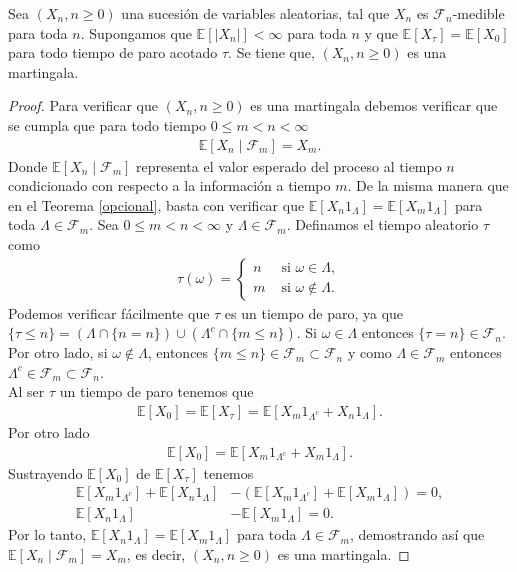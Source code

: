 \begin{theorem}
\label{condmartin}
	Sea $(X_n, n \geq 0)$ una sucesión de variables aleatorias, tal que $X_n$ es $\mathcal{F}_n$-medible para toda $n$. Supongamos que $\mathbb{E}[|X_n|] < \infty$ para toda $n$ y que $\mathbb{E}[X_{\tau}] = \mathbb{E}[X_0]$ para todo tiempo de paro acotado $\tau$. Se tiene que, $(X_n, n \geq 0)$ es una martingala.
\end{theorem}
\begin{proof}
	Para verificar que $(X_n, n \geq 0)$ es una martingala debemos verificar que se cumpla que para todo tiempo $0 \leq m < n < \infty$
	\begin{align*}
		\mathbb{E}[X_n \mid \mathcal{F}_m] = X_m.
	\end{align*}
	Donde $\mathbb{E}[X_n \mid \mathcal{F}_m]$ representa el valor esperado del proceso al tiempo $n$ condicionado con respecto a la información a tiempo $m$. De la misma manera que en el Teorema \ref{opcional}, basta con verificar que $\mathbb{E}[X_n 1_{\Lambda}] = \mathbb{E}[X_m 1_{\Lambda}]$ para toda $\Lambda \in \mathcal{F}_m$.
	Sea $0 \leq m < n < \infty$ y $\Lambda \in \mathcal{F}_m$. Definamos el tiempo aleatorio $\tau$ como
	\begin{align*}
		\tau (\omega) =
		\begin{cases}
			n & \text{ si } \omega \in \Lambda, \\
			m & \text{ si } \omega \notin \Lambda.
		\end{cases}
	\end{align*}
	Podemos verificar fácilmente que $\tau$ es un tiempo de paro, ya que $\{\tau \leq n\} = (\Lambda \cap \{n = n\}) \cup (\Lambda^c \cap \{m \leq n\})$. Si $\omega \in \Lambda$ entonces $\{\tau = n\} \in \mathcal{F}_n$. Por otro lado, si $\omega \notin\Lambda$, entonces $\{m \leq n\} \in \mathcal{F}_m \subset \mathcal{F}_n$ y como $\Lambda \in \mathcal{F}_m$ entonces $\Lambda^c \in \mathcal{F}_m \subset \mathcal{F}_n$. \\
	
\noindent Al ser $\tau$ un tiempo de paro tenemos que
	\begin{align*}
		\mathbb{E}[X_0] = \mathbb{E}[X_{\tau}] = \mathbb{E}[X_m1_{\Lambda^c} + X_n1_{\Lambda}].
	\end{align*}
	Por otro lado
	\begin{align*}
		\mathbb{E}[X_0] = \mathbb{E}[X_m1_{\Lambda^c} + X_m1_{\Lambda}].
	\end{align*}
	Sustrayendo $\mathbb{E}[X_0]$ de $\mathbb{E}[X_{\tau}]$ tenemos
	\begin{align*}
		\mathbb{E}[X_m1_{\Lambda^c}] + \mathbb{E}[X_n1_{\Lambda}] & - (\mathbb{E}[X_m1_{\Lambda^c}] + \mathbb{E}[X_m1_{\Lambda}]) = 0, \\
		\mathbb{E}[X_n1_{\Lambda}] & -  \mathbb{E}[X_m1_{\Lambda}] = 0.
	\end{align*}
	Por lo tanto, $\mathbb{E}[X_n1_{\Lambda}] = \mathbb{E}[X_m1_{\Lambda}]$ para toda $\Lambda \in \mathcal{F}_m$, demostrando así que $\mathbb{E}[X_n \mid \mathcal{F}_m] = X_m$, es decir, $(X_n, n \geq 0)$ es una martingala. 
\end{proof}

